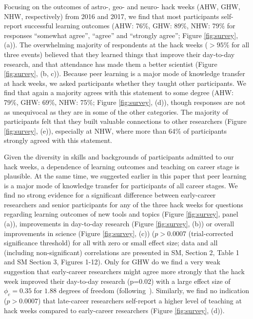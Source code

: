 Focusing on the outcomes of astro-, geo- and neuro- hack weeks (AHW, GHW, NHW, respectively) from 2016 and 2017, we find that most participants self-report successful learning outcomes (AHW: 76\%, GHW: 89\%, NHW: 79\% for responses ``somewhat agree'', ``agree'' and ``strongly agree''; Figure \ref{fig:survey}, (a)).
The overwhelming majority of respondents at the hack weeks ($>95\%$ for all three events) believed that they learned things that improve their day-to-day research, and that attendance has made them a better scientist  (Figure \ref{fig:survey}, (b, c)).
Because peer learning is a major mode of knowledge transfer at hack weeks, we asked participants whether they taught other participants.
We find that again a majority agrees with this statement to some degree (AHW: 79\%, GHW: 69\%, NHW: 75\%; Figure \ref{fig:survey}, (d)), though responses are not as unequivocal as they are in some of the other categories.
The majority of participants felt that they built valuable connections to other researchers (Figure \ref{fig:survey}, (e)), especially at NHW, where more than 64\% of participants strongly agreed with this statement.

Given the diversity in skills and backgrounds of participants admitted to our hack weeks, a dependence of learning outcomes and teaching on career stage is plausible. At the same time, we suggested earlier in this paper that peer learning is a major mode of knowledge transfer for participants of all career stages. We find no strong evidence for a significant difference between early-career researchers and senior participants for any of the three hack weeks for questions regarding learning outcomes of new tools and topics (Figure \ref{fig:survey}, panel (a)), improvements in day-to-day research (Figure \ref{fig:survey}, (b)) or overall improvements in science (Figure \ref{fig:survey}, (c)) ($p > 0.0007$ (trial-corrected significance threshold) for all with zero or small effect size; data and all (including non-significant) correlations are presented in SM, Section 2, Table 1 and SM Section 3, Figures 1-12). Only for GHW do we find a very weak suggestion that early-career researchers might agree more strongly that the hack week improved their day-to-day research (p=0.02) with a large effect size of $\phi_c = 0.35$ for $1.88$ degrees of freedom (following~\citep{cohen1988}).
Similarly, we find no indication ($p > 0.0007$) that late-career researchers self-report a higher level of teaching at hack weeks compared to early-career researchers (Figure \ref{fig:survey}, (d)).

